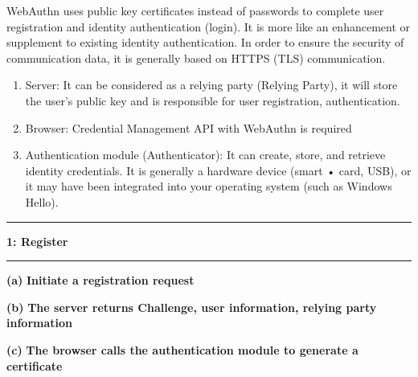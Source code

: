 \documentclass[11pt]{article}
\newcommand\question[2]{\vspace{.25in}\hrule\textbf{#1: #2}\vspace{.5em}\hrule\vspace{.10in}}
\renewcommand\part[1]{\vspace{.10in}\textbf{(#1)}}
\begin{document}
\raggedright
\newcommand\NAME{Yao Xiao}  %
\newcommand\ANDREWID{2019180015}     %
\newcommand\HWNUM{4}              %


WebAuthn uses public key certificates instead of passwords to complete user registration and identity authentication (login). 
It is more like an enhancement or supplement to existing identity authentication. 
In order to ensure the security of communication data, it is generally based on HTTPS (TLS) communication.

\begin{enumerate}
    \item Server: It can be considered as a relying party (Relying Party), it will store the user's public key and is responsible for user registration, authentication.
    \item Browser: Credential Management API with WebAuthn is required
    \item Authentication module (Authenticator): It can create, store, and retrieve identity credentials. 
    It is generally a hardware device (smart • card, USB), or it may have been integrated into your operating system (such as Windows Hello).
\end{enumerate}

\question{1}{Register} 


\part{a} \textbf{Initiate a registration request}

\part{b} \textbf{The server returns Challenge, user information, relying party information}

\part{c} \textbf{The browser calls the authentication module to generate a certificate}
\end{document}
